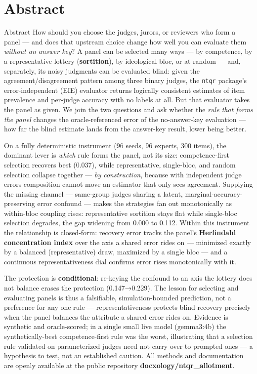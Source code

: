 \documentclass[
  ignorenonframetext,
]{beamer}
\author{\texorpdfstring{}{}}
\date{}
\begin{document}
\section{Abstract}\label{abstract}

\begin{frame}{Abstract}
How should you choose the judges, jurors, or reviewers who form a panel
--- and does that upstream choice change how well you can evaluate them
\emph{without an answer key}? A panel can be selected many ways --- by
competence, by a representative lottery (\textbf{sortition}), by
ideological bloc, or at random --- and, separately, its noisy judgments
can be evaluated blind: given the agreement/disagreement pattern among
three binary judges, the \texttt{ntqr} package's error-independent (EIE)
evaluator returns logically consistent estimates of item prevalence and
per-judge accuracy with no labels at all. But that evaluator takes the
panel as given. We join the two questions and ask whether the \emph{rule
that forms the panel} changes the oracle-referenced error of the
no-answer-key evaluation --- how far the blind estimate lands from the
answer-key result, lower being better.

On a fully deterministic instrument (96 seeds, 96 experts, 300 items),
the dominant lever is \emph{which} rule forms the panel, not its size:
competence-first selection recovers best (0.037), while representative,
single-bloc, and random selection collapse together --- \emph{by
construction}, because with independent judge errors composition cannot
move an estimator that only sees agreement. Supplying the missing
channel --- same-group judges sharing a latent,
marginal-accuracy-preserving error confound --- makes the strategies fan
out monotonically as within-bloc coupling rises: representative
sortition stays flat while single-bloc selection degrades, the gap
widening from 0.000 to 0.112. Within this instrument the relationship is
closed-form: recovery error tracks the panel's \textbf{Herfindahl
concentration index} over the axis a shared error rides on --- minimized
exactly by a balanced (representative) draw, maximized by a single bloc
--- and a continuous representativeness dial confirms error rises
monotonically with it.

The protection is \textbf{conditional}: re-keying the confound to an
axis the lottery does not balance erases the protection (0.147→0.229).
The lesson for selecting and evaluating panels is thus a falsifiable,
simulation-bounded prediction, not a preference for any one rule ---
representativeness protects blind recovery precisely when the panel
balances the attribute a shared error rides on. Evidence is synthetic
and oracle-scored; in a single small live model (gemma3:4b) the
synthetically-best competence-first rule was the worst, illustrating
that a selection rule validated on parameterized judges need not carry
over to prompted ones --- a hypothesis to test, not an established
caution. All methods and documentation are openly available at the
public repository \textbf{docxology/ntqr\_allotment}.
\end{frame}
\end{document}
